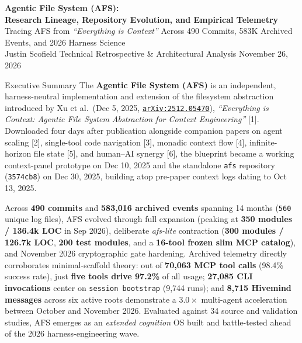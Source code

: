 \documentclass[10pt,letterpaper]{article}
\newcommand{\code}[1]{\texttt{\color{InkNavy}#1}}
\newcommand{\arxiv}[1]{\href{https://arxiv.org/abs/#1}{\code{arXiv:#1}}}
\begin{document}
\begin{center}
  {\sffamily\bfseries\LARGE\color{InkNavy} Agentic File System (AFS):\\[2pt] Research Lineage, Repository Evolution, and Empirical Telemetry}\\[6pt]
  {\sffamily\normalsize\color{SlateBlue} Tracing AFS from \emph{``Everything is Context''} Across 490 Commits, 583K Archived Events, and 2026 Harness Science}\\[5pt]
  {\sffamily\small\color{MutedGray} Justin Scofield \quad\textbar\quad Technical Retrospective \& Architectural Analysis \quad\textbar\quad November 26, 2026}
\end{center}
\vspace{2pt}

\begin{summarybox}{Executive Summary}
The \textbf{Agentic File System (AFS)} is an independent, harness-neutral implementation and extension of the filesystem abstraction introduced by Xu et al.\ (Dec 5, 2025, \arxiv{2512.05470}), \emph{``Everything is Context: Agentic File System Abstraction for Context Engineering''} [1]. Downloaded four days after publication alongside companion papers on agent scaling [2], single-tool code navigation [3], monadic context flow [4], infinite-horizon file state [5], and human--AI synergy [6], the blueprint became a working context-panel prototype on Dec 10, 2025 and the standalone \code{afs} repository (\code{3574cb8}) on Dec 30, 2025, building atop pre-paper context logs dating to Oct 13, 2025.

Across \textbf{490 commits} and \textbf{583,016 archived events} spanning 14 months (\code{560} unique log files), AFS evolved through full expansion (peaking at \textbf{350 modules / 136.4k LOC} in Sep 2026), deliberate \emph{afs-lite} contraction (\textbf{300 modules / 126.7k LOC}, \textbf{200 test modules}, and a \textbf{16-tool frozen slim MCP catalog}), and November 2026 cryptographic gate hardening. Archived telemetry directly corroborates minimal-scaffold theory: out of \textbf{70,063 MCP tool calls} (98.4\% success rate), just \textbf{five tools drive 97.2\%} of all usage; \textbf{27,085 CLI invocations} center on \code{session bootstrap} (9,744 runs); and \textbf{8,715 Hivemind messages} across six active roots demonstrate a $3.0\times$ multi-agent acceleration between October and November 2026. Evaluated against 34 source and validation studies, AFS emerges as an \emph{extended cognition} OS built and battle-tested ahead of the 2026 harness-engineering wave.
\end{summarybox}
\end{document}
